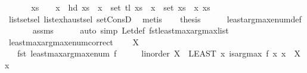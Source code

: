 \begin{isabellebody}
%
\isadelimproof
%
\endisadelimproof
%
\isatagproof
{}\isamarkupfalse%
\ {\isacharminus}{\kern0pt}\isanewline
\ \ \isamarkupfalse%
\ {\isacharasterisk}{\kern0pt}{\isacharcolon}{\kern0pt}\ {\isachardoublequoteopen}xs\ {\isasymnoteq}\ {\isacharbrackleft}{\kern0pt}{\isacharbrackright}{\kern0pt}\ {\isasymLongrightarrow}\ {\isacharparenleft}{\kern0pt}x\ {\isacharequal}{\kern0pt}\ hd\ xs\ {\isasymor}\ x\ {\isasymin}\ set\ {\isacharparenleft}{\kern0pt}tl\ xs{\isacharparenright}{\kern0pt}{\isacharparenright}{\kern0pt}\ {\isasymlongleftrightarrow}\ x\ {\isasymin}\ set\ xs{\isachardoublequoteclose}\ \ x\ xs\isanewline
\ \ \ \ \isamarkupfalse%
\ list{\isachardot}{\kern0pt}set{\isacharunderscore}{\kern0pt}sel\ list{\isachardot}{\kern0pt}exhaust{\isacharunderscore}{\kern0pt}sel\ set{\isacharunderscore}{\kern0pt}ConsD\ \isamarkupfalse%
\ metis\isanewline
\ \ \isamarkupfalse%
\ {\isacharquery}{\kern0pt}thesis\isanewline
\ \ \ \ \isamarkupfalse%
\ least{\isacharunderscore}{\kern0pt}arg{\isacharunderscore}{\kern0pt}max{\isacharunderscore}{\kern0pt}enum{\isacharunderscore}{\kern0pt}def\isanewline
\ \ \ \ \isamarkupfalse%
\ \ assms\isanewline
\ \ \ \ \isamarkupfalse%
\ {\isacharparenleft}{\kern0pt}auto\ simp{\isacharcolon}{\kern0pt}\ Let{\isacharunderscore}{\kern0pt}def\ fst{\isacharunderscore}{\kern0pt}least{\isacharunderscore}{\kern0pt}max{\isacharunderscore}{\kern0pt}arg{\isacharunderscore}{\kern0pt}max{\isacharunderscore}{\kern0pt}list\ {\isacharasterisk}{\kern0pt}{\isacharparenright}{\kern0pt}\isanewline
{}\isamarkupfalse%
%
\endisatagproof
{\isafoldproof}%
%
\isadelimproof
\isanewline
%
\endisadelimproof
\isanewline
{}\isamarkupfalse%
\ least{\isacharunderscore}{\kern0pt}max{\isacharunderscore}{\kern0pt}arg{\isacharunderscore}{\kern0pt}max{\isacharunderscore}{\kern0pt}enum{\isacharunderscore}{\kern0pt}correct{}{\isacharcolon}{\kern0pt}\ \isanewline
\ \ \ {\isachardoublequoteopen}X\ {\isasymnoteq}\ {\isacharbraceleft}{\kern0pt}{\isacharbraceright}{\kern0pt}{\isachardoublequoteclose}\ \isanewline
\ \ \ {\isachardoublequoteopen}fst\ {\isacharparenleft}{\kern0pt}least{\isacharunderscore}{\kern0pt}max{\isacharunderscore}{\kern0pt}arg{\isacharunderscore}{\kern0pt}max{\isacharunderscore}{\kern0pt}enum\ {\isacharparenleft}{\kern0pt}f\ {\isacharcolon}{\kern0pt}{\isacharcolon}{\kern0pt}\ {\isacharunderscore}{\kern0pt}\ {\isasymRightarrow}\ {\isacharparenleft}{\kern0pt}{\isacharunderscore}{\kern0pt}\ {\isacharcolon}{\kern0pt}{\isacharcolon}{\kern0pt}\ linorder{\isacharparenright}{\kern0pt}{\isacharparenright}{\kern0pt}\ X{\isacharparenright}{\kern0pt}\ {\isacharequal}{\kern0pt}\ {\isacharparenleft}{\kern0pt}LEAST\ x{\isachardot}{\kern0pt}\ is{\isacharunderscore}{\kern0pt}arg{\isacharunderscore}{\kern0pt}max\ f\ {\isacharparenleft}{\kern0pt}{\isasymlambda}x{\isachardot}{\kern0pt}\ x\ {\isasymin}\ X{\isacharparenright}{\kern0pt}\ x{\isacharparenright}{\kern0pt}{\isachardoublequoteclose}\isanewline

\end{isabellebody}
